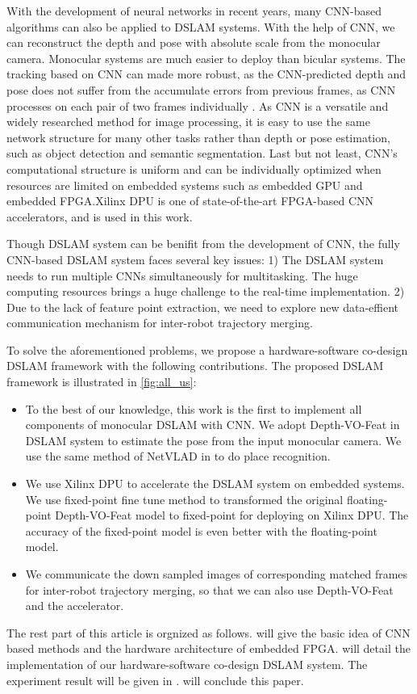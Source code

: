 With the development of neural networks in recent years, many CNN-based algorithms can also be applied to DSLAM systems. With the help of CNN, we can  reconstruct the depth and pose with absolute scale from the monocular camera. Monocular systems are much easier to deploy than bicular systems. 
The tracking based on CNN can made more robust, as the CNN-predicted depth and pose does not suffer from the accumulate errors from previous frames, as CNN processes on each pair of two frames individually \cite{Tateno:2017776}. As CNN is a versatile and widely researched method for image processing, it is easy to use the same network structure for many other tasks rather than depth or pose estimation, such as object detection \cite{SSD} and semantic segmentation\cite{segmentation}. 
Last but not least, CNN's computational structure is uniform and can be individually optimized when resources are limited on embedded systems such as embedded GPU\cite{GPUacc} and embedded FPGA\cite{Yu:2018:IDC:3299999.3283452}.Xilinx DPU\cite{Tech:2019360} is one of state-of-the-art FPGA-based CNN accelerators, and is used in this work.

Though DSLAM system can be benifit from the development of CNN, the fully CNN-based DSLAM system faces several key issues: 1) The DSLAM system needs to run multiple CNNs simultaneously for multitasking. The huge computing resources brings a huge challenge to the real-time implementation. 2) Due to the lack of feature point extraction, we need to explore new data-effient communication mechanism for inter-robot trajectory merging.

To solve the aforementioned problems, we propose a hardware-software co-design DSLAM framework with the following contributions. The proposed DSLAM framework is illustrated in \cref{fig:all_us}:

\begin{itemize}
\item To the best of our knowledge, this work is the first to implement all components of monocular DSLAM with CNN. We adopt Depth-VO-Feat \cite{Zhan:2018e92} in DSLAM system to estimate the pose from the input monocular camera. We use the same method of NetVLAD in \cite{Cieslewski:20187ee} to do place recognition.
\item We use Xilinx DPU to accelerate the DSLAM system on embedded systems. We use fixed-point fine tune method to transformed the original floating-point Depth-VO-Feat model to fixed-point for deploying on Xilinx DPU. The accuracy of the fixed-point model is even better with the floating-point model.
\item We communicate the down sampled images of corresponding matched frames for inter-robot trajectory merging, so that we can also use Depth-VO-Feat and the accelerator.
\end{itemize}
    
   
The rest part of this article is orgnized as follows.  will give the basic idea of CNN based methods and the hardware architecture of embedded FPGA.  will detail the implementation of our hardware-software co-design DSLAM system. The experiment result will be given in .  will conclude this paper.